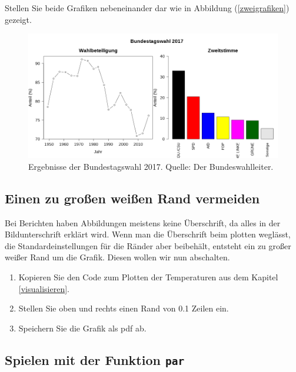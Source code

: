 \documentclass[]{book}
\providecommand{\tightlist}{%
  \setlength{\itemsep}{0pt}\setlength{\parskip}{0pt}}
\begin{document}
Stellen Sie beide Grafiken nebeneinander dar wie in Abbildung (\ref{zweigrafiken}) gezeigt.

\begin{figure}
\includegraphics[width=1\linewidth]{Zwei_grafiken} \caption{Ergebnisse der Bundestagswahl 2017. Quelle: Der Bundeswahlleiter.}\label{fig:zweigrafiken}
\end{figure}

\hypertarget{weisserrand}{%
\subsection{Einen zu großen weißen Rand vermeiden}\label{weisserrand}}

Bei Berichten haben Abbildungen meistens keine Überschrift, da alles in der Bildunterschrift erklärt wird. Wenn man die Überschrift beim plotten weglässt, die Standardeinstellungen für die Ränder aber beibehält, entsteht ein zu großer weißer Rand um die Grafik. Diesen wollen wir nun abschalten.

\begin{enumerate}
\def\labelenumi{\arabic{enumi}.}
\tightlist
\item
  Kopieren Sie den Code zum Plotten der Temperaturen aus dem Kapitel \ref{visualisieren}.
\item
  Stellen Sie oben und rechts einen Rand von 0.1 Zeilen ein.
\item
  Speichern Sie die Grafik als pdf ab.
\end{enumerate}

\hypertarget{spielen-mit-der-funktion-par}{%
\subsection{\texorpdfstring{Spielen mit der Funktion \texttt{par}}{Spielen mit der Funktion par}}\label{spielen-mit-der-funktion-par}}
\end{document}
